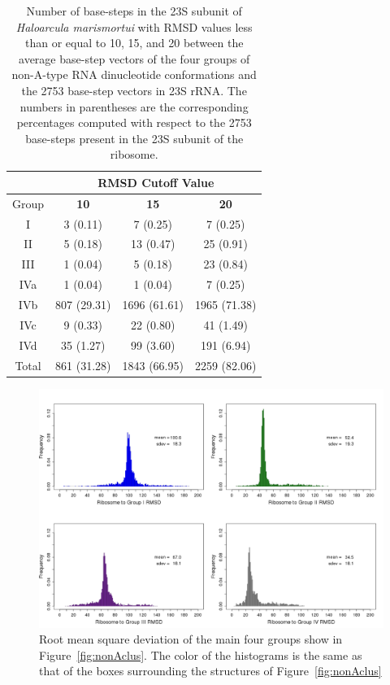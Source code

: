 \begin{table}[htbp]
\begin{center}
{\footnotesize
\begin{tabular}{c|c|c|c}
\hline
 & \multicolumn{3}{c}{\bf{RMSD Cutoff Value}}\\ \hline
Group   & \bf{10} & \bf{15} & \bf{20}\\ \hline
I & 3 (0.11) & 7 (0.25) & 7 (0.25)\\ \hline
II & 5 (0.18) & 13 (0.47) & 25 (0.91)\\ \hline
III & 1 (0.04) & 5 (0.18) & 23 (0.84)\\ \hline
IVa & 1 (0.04) & 1 (0.04) & 7 (0.25)\\ \hline
IVb & 807 (29.31) & 1696 (61.61) & 1965 (71.38)\\ \hline
IVc & 9 (0.33) & 22 (0.80) & 41 (1.49)\\ \hline
IVd & 35 (1.27) & 99 (3.60) & 191 (6.94)\\ \hline \hline
Total & 861 (31.28) & 1843 (66.95) & 2259 (82.06)\\ \hline
\end{tabular}
}
\caption{Number of base-steps in the 23S subunit of \textit{Haloarcula
    marismortui} with RMSD values less than or equal to 10, 15, and 20
  between  the  average  base-step  vectors  of  the  four  groups  of
  non-A-type  RNA dinucleotide  conformations and  the  2753 base-step
  vectors  in   23S  rRNA.   The   numbers  in  parentheses   are  the
  corresponding  percentages   computed  with  respect   to  the  2753
  base-steps present in the 23S subunit of the ribosome.}
\label{tab:nonA}
\end{center}
\end{table}

\begin{figure}[htbp]
 \centering
\includegraphics[angle=90, scale=0.5]{Chapter2/RMSDschneider1.png}
\caption{Root mean square deviation of the main four groups show in
  Figure~\ref{fig:nonAclus}. The color of the histograms is the same
  as that of the boxes surrounding the structures of
  Figure~\ref{fig:nonAclus}}
 \label{fig:histo1}
\end{figure}

